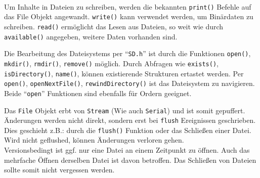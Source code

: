 \documentclass[ngerman]{handout}
\begin{document}
\begin{multicols*}{2}
    \\

    Um Inhalte in Dateien zu schreiben, werden die bekannten \texttt{print()} Befehle auf das File Objekt angewandt.
    \texttt{write()} kann verwendet werden, um Binärdaten zu schreiben.
    \texttt{read()} ermöglicht das Lesen aus Dateien, so weit wie durch \texttt{available()} angegeben, weitere Daten vorhanden sind.

    Die Bearbeitung des Dateisystems per \enquote{\texttt{SD.h}} ist durch die Funktionen \texttt{open()}, \texttt{mkdir()}, \texttt{rmdir()}, \texttt{remove()} möglich.
    Durch Abfragen wie \texttt{exists()}, \texttt{isDirectory()}, \texttt{name()}, können existierende Strukturen ertastet werden.
    Per \texttt{open()}, \texttt{openNextFile()}, \texttt{rewindDirectory()} ist das Dateisystem zu navigieren.
    Beide \enquote{\texttt{open}} Funktionen sind ebenfalls für Ordern geeignet.

    Das \texttt{File} Objekt erbt von \texttt{Stream} (Wie auch \texttt{Serial}) und ist somit gepuffert.
    Änderungen werden nicht direkt, sondern erst bei \texttt{flush} Ereignissen geschrieben.
    Dies geschieht z.B.: durch die \texttt{flush()} Funktion oder das Schließen einer Datei.
    Wird nicht geflushed, können Änderungen verloren gehen.\\

    Versionsbedingt ist ggf. nur eine Datei an einem Zeitpunkt zu öffnen.
    Auch das mehrfache Öffnen derselben Datei ist davon betroffen.
    Das Schließen von Dateien sollte somit nicht vergessen werden.\\


\end{multicols*}
\end{document}
